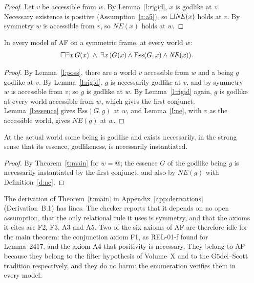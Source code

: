 \documentclass{situationist-preprint}
\newcommand{\NE}{\mathit{NE}}
\newcommand{\Ess}{\mathrm{Ess}}
\begin{document}
\begin{proof}
Let $v$ be accessible from $w$. By Lemma~\ref{l:rigid}, $x$ is godlike at $v$. Necessary existence is positive (Assumption~\ref{a:a5}), so $\nec\NE(x)$ holds at $v$. By symmetry $w$ is accessible from $v$, so $\NE(x)$ holds at $w$.
\end{proof}

\begin{theorem}\label{t:main}
In every model of AF on a symmetric frame, at every world $w$:
\[
\nec\exists x\,G(x) \;\wedge\; \exists x\,(G(x) \wedge \Ess(G,x) \wedge \NE(x)).
\]
\end{theorem}

\begin{proof}
By Lemma~\ref{l:poss}, there are a world $v$ accessible from $w$ and a being $g$ godlike at $v$. By Lemma~\ref{l:rigid}, $g$ is necessarily godlike at $v$, and by symmetry $w$ is accessible from $v$; so $g$ is godlike at $w$. By Lemma~\ref{l:rigid} again, $g$ is godlike at every world accessible from $w$, which gives the first conjunct. Lemma~\ref{l:essence} gives $\Ess(G,g)$ at $w$, and Lemma~\ref{l:ne}, with $v$ as the accessible world, gives $\NE(g)$ at $w$.
\end{proof}

\begin{corollary}\label{c:actual}
At the actual world some being is godlike and exists necessarily, in the strong sense that its essence, godlikeness, is necessarily instantiated.
\end{corollary}

\begin{proof}
By Theorem~\ref{t:main} for $w = @$; the essence $G$ of the godlike being $g$ is necessarily instantiated by the first conjunct, and also by $\NE(g)$ with Definition~\ref{d:ne}.
\end{proof}

The derivation of Theorem~\ref{t:main} in Appendix~\ref{app:derivations} (Derivation~B.1) has \csLinesAf{} lines. The checker reports that it depends on no open assumption, that the only relational rule it uses is symmetry, and that the axioms it cites are F2, F3, A3 and A5. Two of the six axioms of AF are therefore idle for the main theorem: the conjunction axiom F1, as REL-01-f found for Lemma~2417, and the axiom A4 that positivity is necessary. They belong to AF because they belong to the filter hypothesis of Volume~X and to the Gödel--Scott tradition respectively, and they do no harm: the enumeration verifies them in every model.
\end{document}
